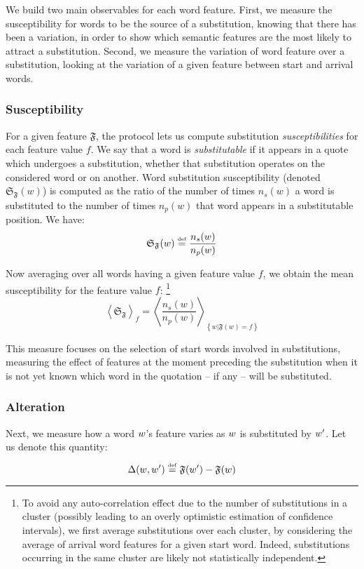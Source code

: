 We build two main observables for each word feature.
First, we measure the susceptibility for words to be the source of a substitution, knowing that there has been a variation, in order to show which semantic features are the most likely to attract a substitution.
Second, we measure the variation of word feature over a substitution, looking at the variation of a given feature between start and arrival words.

\subsubsection{Susceptibility}

For a given feature $\mathfrak{F}$, the protocol lets us compute substitution \emph{susceptibilities} for each feature value $f$.
We say that a word is \emph{substitutable} if it appears in a quote which undergoes a substitution, whether that substitution operates on the considered word or on another.
Word substitution susceptibility (denoted $\mathfrak{S}_{\mathfrak{F}}(w)$) is computed as the ratio of the number of times $n_s(w)$ a word is substituted to the number of times $n_p(w)$ that word appears in a substitutable position.
We have:
$$\mathfrak{S}_{\mathfrak{F}}(w) \overset{\underset{\mathrm{def}}{}}{=} \frac{n_s(w)}{n_p(w)}$$

Now averaging over all words having a given feature value $f$, we obtain the mean susceptibility for the feature value $f$:
\footnote{To avoid any auto-correlation effect due to the number of substitutions in a cluster (possibly leading to an overly optimistic estimation of confidence intervals), we first average substitutions over each cluster, by considering the average of arrival word features for a given start word.
Indeed, substitutions occurring in the same cluster are likely not statistically independent.}
$$\left< \mathfrak{S}_{\mathfrak{F}} \right>_f = \left< \frac{n_s(w)}{n_p(w)} \right>_{\left\lbrace w | \mathfrak{F}(w) = f \right\rbrace}$$

This measure focuses on the selection of start words involved in substitutions, measuring the effect of features at the moment preceding the substitution when it is not yet known which word in the quotation -- if any -- will be substituted.

\subsubsection{Alteration}

Next, we measure how a word $w$'s feature varies as $w$ is substituted by $w'$.
Let us denote this quantity:
$$\Delta (w,w') \overset{\underset{\mathrm{def}}{}}{=} \mathfrak{F}(w') - \mathfrak{F}(w)$$

